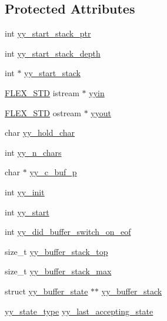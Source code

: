 \subsection*{Protected Attributes}
\begin{DoxyCompactItemize}
\item 
int \hyperlink{classyyFlexLexer_a45cf5f774631413c0d7aa820e8acb761}{yy\+\_\+start\+\_\+stack\+\_\+ptr}
\item 
int \hyperlink{classyyFlexLexer_a23f6dda98adbcbe13cfbfd1c74efc66f}{yy\+\_\+start\+\_\+stack\+\_\+depth}
\item 
int $\ast$ \hyperlink{classyyFlexLexer_abbb8bfcab69577e4d708e33c4627967d}{yy\+\_\+start\+\_\+stack}
\item 
\hyperlink{FlexLexer_8h_ae50ff830f34b9e244163babb41a1552d}{F\+L\+E\+X\+\_\+\+S\+TD} istream $\ast$ \hyperlink{classyyFlexLexer_a5be30a2c4ed9973f0ede10322ca9dbe8}{yyin}
\item 
\hyperlink{FlexLexer_8h_ae50ff830f34b9e244163babb41a1552d}{F\+L\+E\+X\+\_\+\+S\+TD} ostream $\ast$ \hyperlink{classyyFlexLexer_ac78543eed2c5f96cb6e4256450f0a923}{yyout}
\item 
char \hyperlink{classyyFlexLexer_a11b21266d7c772de839fe15c978e84be}{yy\+\_\+hold\+\_\+char}
\item 
int \hyperlink{classyyFlexLexer_ac2fa33e27e117953f53738b85d56353c}{yy\+\_\+n\+\_\+chars}
\item 
char $\ast$ \hyperlink{classyyFlexLexer_a117a76190eab99960a06ec667dee9abc}{yy\+\_\+c\+\_\+buf\+\_\+p}
\item 
int \hyperlink{classyyFlexLexer_a41cf7d4197a347a025cd10e042315bc4}{yy\+\_\+init}
\item 
int \hyperlink{classyyFlexLexer_afcad81a77535144e11e2a897eaa724b7}{yy\+\_\+start}
\item 
int \hyperlink{classyyFlexLexer_afdb4b21e0d512793a74d2eff444bffa9}{yy\+\_\+did\+\_\+buffer\+\_\+switch\+\_\+on\+\_\+eof}
\item 
size\+\_\+t \hyperlink{classyyFlexLexer_ad30ce09b0f06b749463bb1ddc8f74877}{yy\+\_\+buffer\+\_\+stack\+\_\+top}
\item 
size\+\_\+t \hyperlink{classyyFlexLexer_ad94e6d3987eb9dad09041a5cb006da7b}{yy\+\_\+buffer\+\_\+stack\+\_\+max}
\item 
struct \hyperlink{structyy__buffer__state}{yy\+\_\+buffer\+\_\+state} $\ast$$\ast$ \hyperlink{classyyFlexLexer_ae4914f003bda6f0dfc20e30703673bea}{yy\+\_\+buffer\+\_\+stack}
\item 
\hyperlink{FlexLexer_8h_a9ba7c416f135b0f0c1f4addded4616b5}{yy\+\_\+state\+\_\+type} \hyperlink{classyyFlexLexer_a7f55fb6c3dadf359d4085ecb88a39bc3}{yy\+\_\+last\+\_\+accepting\+\_\+state}
$$
\end{DoxyCompactItemize}
